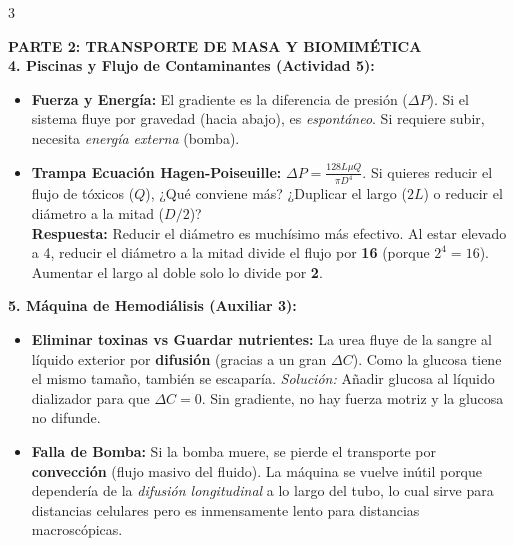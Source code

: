 \documentclass[9pt,landscape,letterpaper]{extarticle}
\begin{document}
\begin{multicols*}{3}
	\begin{tcolorbox}[colback=tipsbg,colframe=tipsframe,boxrule=1pt,arc=3pt,left=3pt,right=3pt,top=3pt,bottom=3pt]
		\textbf{\color{myblue} PARTE 2: TRANSPORTE DE MASA Y BIOMIMÉTICA}\\
		\textbf{4. Piscinas y Flujo de Contaminantes (Actividad 5):}
		\begin{itemize}
			\item \textbf{Fuerza y Energía:} El gradiente es la diferencia de presión ($\Delta P$). Si el sistema fluye por gravedad (hacia abajo), es \textit{espontáneo}. Si requiere subir, necesita \textit{energía externa} (bomba).
			\item \textbf{Trampa Ecuación Hagen-Poiseuille:} $\Delta P = \frac{128 L \mu Q}{\pi D^4}$. Si quieres reducir el flujo de tóxicos ($Q$), ¿Qué conviene más? ¿Duplicar el largo ($2L$) o reducir el diámetro a la mitad ($D/2$)? \\
			      \textbf{Respuesta:} Reducir el diámetro es muchísimo más efectivo. Al estar elevado a 4, reducir el diámetro a la mitad divide el flujo por \textbf{16} (porque $2^4=16$). Aumentar el largo al doble solo lo divide por \textbf{2}.
		\end{itemize}

		\textbf{5. Máquina de Hemodiálisis (Auxiliar 3):}
		\begin{itemize}
			\item \textbf{Eliminar toxinas vs Guardar nutrientes:} La urea fluye de la sangre al líquido exterior por \textbf{difusión} (gracias a un gran $\Delta C$). Como la glucosa tiene el mismo tamaño, también se escaparía. \textit{Solución:} Añadir glucosa al líquido dializador para que \textbf{$\Delta C = 0$}. Sin gradiente, no hay fuerza motriz y la glucosa no difunde.
			\item \textbf{Falla de Bomba:} Si la bomba muere, se pierde el transporte por \textbf{convección} (flujo masivo del fluido). La máquina se vuelve inútil porque dependería de la \textit{difusión longitudinal} a lo largo del tubo, lo cual sirve para distancias celulares pero es inmensamente lento para distancias macroscópicas.
		\end{itemize}


\end{tcolorbox}
\end{multicols*}
\end{document}
